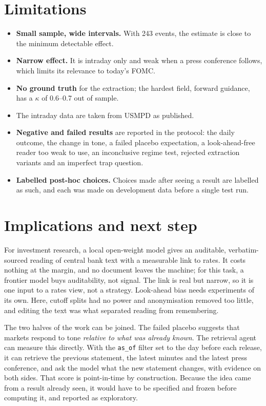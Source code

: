 \documentclass[11pt,a4paper]{article}
\newcommand{\sfb}[1]{{\sffamily\bfseries #1}}
\begin{document}
\section{Limitations}

\begin{itemize}
\item \sfb{Small sample, wide intervals.} With 243 events, the estimate is close to the minimum
  detectable effect.
\item \sfb{Narrow effect.} It is intraday only and weak when a press conference follows, which
  limits its relevance to today's FOMC.
\item \sfb{No ground truth} for the extraction; the hardest field, forward guidance, has a
  $\kappa$ of 0.6--0.7 out of sample.
\item The intraday data are taken from USMPD as published.
\item \sfb{Negative and failed results} are reported in the protocol: the daily outcome, the
  change in tone, a failed placebo expectation, a look-ahead-free reader too weak to use, an
  inconclusive regime test, rejected extraction variants and an imperfect trap question.
\item \sfb{Labelled post-hoc choices.} Choices made after seeing a result are labelled as such,
  and each was made on development data before a single test run.
\end{itemize}

\section{Implications and next step}

For investment research, a local open-weight model gives an auditable, verbatim-sourced reading
of central bank text with a measurable link to rates. It costs nothing at the margin, and no
document leaves the machine; for this task, a frontier model buys auditability, not signal. The
link is real but narrow, so it is one input to a rates view, not a strategy. Look-ahead bias
needs experiments of its own. Here, cutoff splits had no power and anonymisation removed too
little, and editing the text was what separated reading from remembering.

The two halves of the work can be joined. The failed placebo suggests that markets respond to
tone \emph{relative to what was already known}. The retrieval agent can measure this directly.
With the \texttt{as\_of} filter set to the day before each release, it can retrieve the
previous statement, the latest minutes and the latest press conference, and ask the model what
the new statement changes, with evidence on both sides. That score is point-in-time by
construction. Because the idea came from a result already seen, it would have to be specified
and frozen before computing it, and reported as exploratory.
\end{document}
